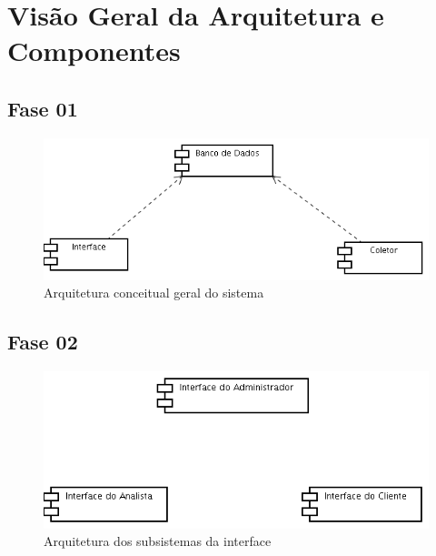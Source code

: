 \chapter{Visão Geral da Arquitetura e Componentes}


\section{Fase 01}

\begin{figure}[hb]
    \begin{center}
        \includegraphics[scale=0.5]{img/conceitual}
        \caption{Arquitetura conceitual geral do sistema}
        \label{fig:arquitetura-conceitual}
    \end{center}
\end{figure}

\section{Fase 02}

\begin{figure}[hb]
    \begin{center}
        \includegraphics[scale=0.5]{img/interface}
        \caption{Arquitetura dos subsistemas da interface}
        \label{fig:arquitetura-interface}
    \end{center}
\end{figure}

